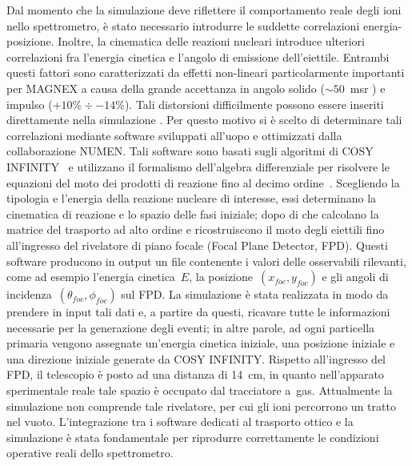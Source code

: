 Dal momento che la simulazione deve riflettere il comportamento reale degli ioni nello spettrometro, è stato necessario introdurre le suddette correlazioni energia-posizione. 
Inoltre, la cinematica delle reazioni nucleari introduce ulteriori correlazioni fra l'energia cinetica e l'angolo di emissione dell'eiettile.
Entrambi questi fattori sono caratterizzati da effetti non-lineari particolarmente importanti per MAGNEX a causa della grande accettanza in angolo solido ($\sim 50$~msr ) e impulso ($ +10\% \div -14\%$). 
Tali distorsioni difficilmente possono essere inseriti direttamente nella simulazione \geant. 
Per questo motivo si è scelto di determinare tali correlazioni mediante software sviluppati all'uopo e ottimizzati dalla collaborazione NUMEN.
Tali software sono basati sugli algoritmi di COSY INFINITY~\cite{makino:nima99} e utilizzano il formalismo dell'algebra differenziale per risolvere le equazioni del moto dei prodotti di reazione fino al decimo ordine~\cite{cappuzzello:epja16}.
Scegliendo la tipologia e l'energia della reazione nucleare di interesse, essi determinano la cinematica di reazione e lo spazio delle fasi iniziale; dopo di che calcolano la matrice del trasporto ad alto ordine e ricostruiscono il moto degli eiettili fino all'ingresso del rivelatore di piano focale (Focal Plane Detector, FPD).
Questi software producono in output un file contenente i valori delle osservabili rilevanti, come ad esempio l'energia cinetica~$E$, la posizione~$(x_{foc},y_{foc})$ e gli angoli di incidenza~$(\theta_{foc},\phi_{foc})$ sul FPD.
La simulazione \geant{} è stata realizzata in modo da prendere in input tali dati e, a partire da questi, ricavare tutte le informazioni necessarie per la generazione degli eventi; in altre parole, ad ogni particella primaria vengono assegnate un'energia cinetica iniziale, una posizione iniziale e una direzione iniziale generate da COSY INFINITY.
Rispetto all'ingresso del FPD, il telescopio è posto ad una distanza di 14~cm, in quanto nell'apparato sperimentale reale tale spazio è occupato dal tracciatore a~gas. 
Attualmente la simulazione non comprende tale rivelatore, per cui gli ioni percorrono un tratto nel vuoto.
L'integrazione tra i software dedicati al trasporto ottico e la simulazione \geant{} è stata fondamentale per riprodurre correttamente le condizioni operative reali dello spettrometro.

